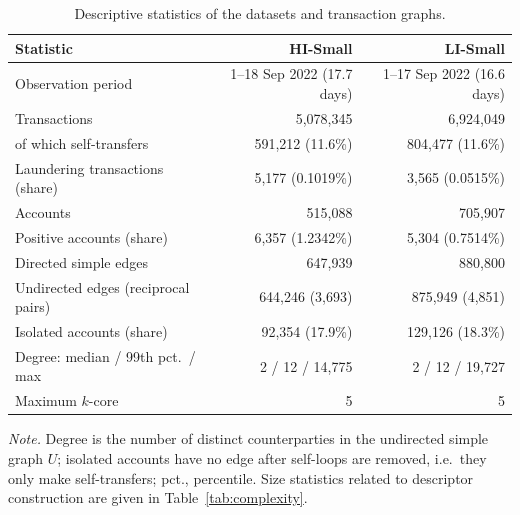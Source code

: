 \begin{table}[htbp]
\centering
\small
\caption{Descriptive statistics of the datasets and transaction graphs.}
\label{tab:data}
\begin{threeparttable}
\begin{tabular}{lrr}
\toprule
Statistic & HI-Small & LI-Small \\
\midrule
Observation period & 1--18 Sep 2022 (17.7 days) & 1--17 Sep 2022 (16.6 days) \\
Transactions & 5,078,345 & 6,924,049 \\
\quad of which self-transfers & 591,212 (11.6\%) & 804,477 (11.6\%) \\
Laundering transactions (share) & 5,177 (0.1019\%) & 3,565 (0.0515\%) \\
Accounts & 515,088 & 705,907 \\
Positive accounts (share) & 6,357 (1.2342\%) & 5,304 (0.7514\%) \\
Directed simple edges & 647,939 & 880,800 \\
Undirected edges (reciprocal pairs) & 644,246 (3,693) & 875,949 (4,851) \\
Isolated accounts (share) & 92,354 (17.9\%) & 129,126 (18.3\%) \\
Degree: median / 99th pct.\ / max & 2 / 12 / 14,775 & 2 / 12 / 19,727 \\
Maximum $k$-core & 5 & 5 \\
\bottomrule
\end{tabular}
\begin{tablenotes}[flushleft]
\footnotesize
\setlength{\labelsep}{0pt}\item[] \textit{Note.} Degree is the number of distinct counterparties in the undirected simple graph $U$; isolated accounts have no edge after self-loops are removed, i.e.\ they only make self-transfers; pct., percentile. Size statistics related to descriptor construction are given in Table~\ref{tab:complexity}.
\end{tablenotes}
\end{threeparttable}
\end{table}

